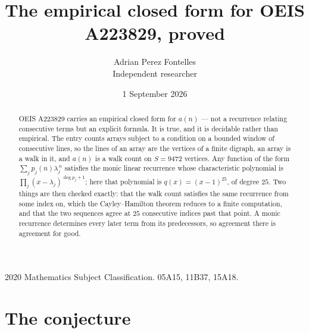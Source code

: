 \documentclass[11pt,a4paper]{article}
\title{The empirical closed form for OEIS A223829, proved}
\author{Adrian Perez Fontelles\\ \small Independent researcher}
\date{1 September 2026}
\theoremstyle{plain}
\theoremstyle{definition}
\begin{document}
\maketitle

\begin{abstract}
OEIS A223829 carries an empirical closed form for $a(n)$ --- not a recurrence relating
consecutive terms but an explicit formula. It is true, and it is decidable rather than
empirical. The entry counts arrays subject to a condition on a bounded window of consecutive lines, so the lines of an array are the
vertices of a finite digraph, an array is a walk in it, and $a(n)$ is a walk count on
$S=9472$ vertices. Any function of the form $\sum_j p_j(n)\lambda_j^{\,n}$ satisfies the
monic linear recurrence whose characteristic polynomial is
$\prod_j(x-\lambda_j)^{\deg p_j+1}$; here that polynomial is $q(x)=(x-1)^{25}$, of degree
$25$. Two things are then checked exactly: that the walk count satisfies the same
recurrence from some index on, which the Cayley--Hamilton theorem reduces to a finite
computation, and that the two sequences agree at $25$ consecutive indices past that
point. A monic recurrence determines every later term from its predecessors, so agreement
there is agreement for good.
\end{abstract}

\noindent\small 2020 Mathematics Subject Classification. 05A15, 11B37, 15A18.\normalsize

\section{The conjecture}
\end{document}
